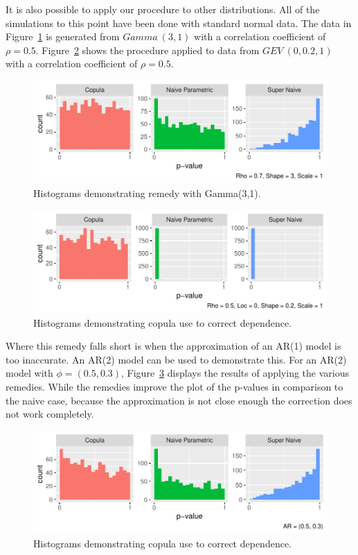 \documentclass[12pt, letterpaper, titlepage]{article}
\begin{document}
It is also possible to apply our procedure to other distributions. All of the simulations
to this point have been done with standard normal data. The data in Figure~\ref{fig:hist_copula_gamma} 
is generated from $Gamma ~ (3,1)$ with a correlation coefficient of $\rho = 0.5$. Figure~\ref{fig:hist_copula_gev}
shows the procedure applied to data from $GEV ~ (0, 0.2, 1)$ with a correlation coefficient of $\rho = 0.5$. 

\begin{figure}[tbp]
  \centering
  \includegraphics{hist_copula_gamma}
  \caption{Histograms demonstrating remedy with Gamma(3,1).}
  \label{fig:hist_copula_gamma}
\end{figure}

\begin{figure}[tbp]
  \centering
  \includegraphics{hist_copula_gev}
  \caption{Histograms demonstrating copula use to correct dependence.}
  \label{fig:hist_copula_gev}
\end{figure}

Where this remedy falls short is when the approximation of an AR(1) model is too inaccurate.
An AR(2) model can be used to demonstrate this. For an AR(2) model with $\phi = (0.5, 0.3)$,
Figure~\ref{fig:hist_copula_ar2} displays the results of applying the various remedies. 
While the remedies improve the plot of the p-values in comparison to the naive case,
because the approximation is not close enough the correction does not work completely.

\begin{figure}[tbp]
  \centering
  \includegraphics{hist_copula_ar2}
  \caption{Histograms demonstrating copula use to correct dependence.}
  \label{fig:hist_copula_ar2}
\end{figure}
\end{document}
